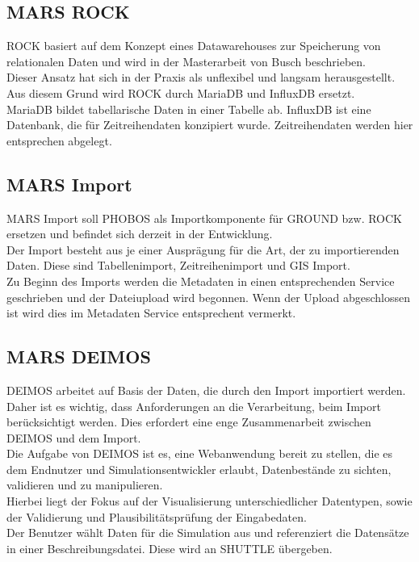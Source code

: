 \documentclass[10pt,conference,compsocconf]{IEEEtran}
\begin{document}
\subsection{MARS ROCK}
ROCK basiert auf dem Konzept eines Datawarehouses zur Speicherung von relationalen Daten und wird in der Masterarbeit von Busch\cite{JanBusch} beschrieben. \\
Dieser Ansatz hat sich in der Praxis als unflexibel und langsam herausgestellt. Aus diesem Grund wird ROCK durch MariaDB und InfluxDB ersetzt. \\
MariaDB bildet tabellarische Daten in einer Tabelle ab. InfluxDB ist eine Datenbank, die für Zeitreihendaten konzipiert wurde. Zeitreihendaten werden hier entsprechen abgelegt.


\subsection{MARS Import}
\label{sub:Import}
MARS Import soll PHOBOS als Importkomponente für GROUND bzw. ROCK ersetzen und befindet sich derzeit in der Entwicklung. \\
Der Import besteht aus je einer Ausprägung für die Art, der zu importierenden Daten. Diese sind Tabellenimport, Zeitreihenimport und GIS Import. \\
Zu Beginn des Imports werden die Metadaten in einen entsprechenden Service geschrieben und der Dateiupload wird begonnen. Wenn der Upload abgeschlossen ist wird dies im Metadaten Service entsprechent vermerkt.


\subsection{MARS DEIMOS}
\label{sub:deimos}
DEIMOS arbeitet auf Basis der Daten, die durch den Import importiert werden. Daher ist es wichtig, dass Anforderungen an die Verarbeitung, beim Import berücksichtigt werden. Dies erfordert eine enge Zusammenarbeit zwischen DEIMOS und dem Import.\\
Die Aufgabe von DEIMOS ist es, eine Webanwendung bereit zu stellen, die es dem Endnutzer und Simulationsentwickler erlaubt, Datenbestände zu sichten, validieren und zu manipulieren.\\
Hierbei liegt der Fokus auf der Visualisierung unterschiedlicher Datentypen, sowie der Validierung und Plausibilitätsprüfung der Eingabedaten.\\
Der Benutzer wählt Daten für die Simulation aus und referenziert die Datensätze in einer Beschreibungsdatei. Diese wird an SHUTTLE übergeben.
\end{document}
